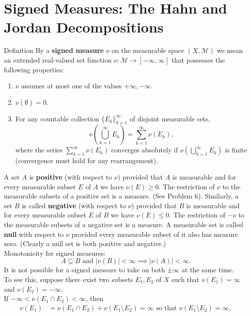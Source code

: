 \section{Signed Measures: The Hahn and Jordan Decompositions}
\begin{flushleft}
	\begin{namedthm*}{Definition}
		By a \textbf{signed measure} $\nu$ on the measurable space $(X,\mathcal{M})$ we mean an extended real-valued set function $\nu:\mathcal{M}\to[-\infty,\infty]$ that possesses the following properties:
		\begin{enumerate}[label=(\roman*),align=left]  
			\item $\nu$ assumes at most one of the values $+\infty,-\infty$.
			\item $\nu(\emptyset)=0$.
			\item For any countable collection $\{E_k\}_{k=1}^\infty$ of disjoint measurable sets,
			\[
				\nu\left(\bigcup_{k=1}^\infty E_k\right)=\sum_{k=1}^\infty\nu(E_k),
			\]
			where the series $\sum_{k=1}^\infty\nu(E_k)$ converges absolutely if $\nu(\bigcup_{k=1}^\infty E_k)$ is finite (convergence must hold for any rearrangement).
		\end{enumerate}
	\end{namedthm*}
	A set $A$ is \textbf{positive} (with respect to $\nu$) provided that $A$ is measurable and for every measurable subset $E$ of $A$ we have $\nu(E)\ge0$.
	The restriction of $\nu$ to the measurable subsets of a positive set is a measure.
	(See Problem 6).
	Similarly, a set $B$ is called \textbf{negative} (with respect to $\nu$) provided that $B$ is measurable and for every measurable subset $E$ of $B$ we have $\nu(E)\le0$.
	The restriction of $-\nu$ to the measurable subsets of a negative set is a measure.
	A measurable set is called \textbf{null} with respect to $\nu$ provided every measurable subset of it also has measure zero.
	(Clearly a null set is both positive and negative.)
	\\Monotonicity for signed measures:
	\[
	A\subseteq B\text{ and }|\nu(B)|<\infty\implies|\nu(A)|<\infty.
	\]
	It is not possible for a signed measure to take on both $\pm\infty$ at the same time.
		\\To see this, suppose there exist two subsets $E_1,E_2$ of $X$ such that $\nu(E_1)=\infty$ and $\nu(E_2)=-\infty$.
		\\If $-\infty<\nu(E_1\cap E_2)<\infty$, then 
		\begin{align*}
			\nu(E_1)&=\nu(E_1\cap E_2)+\nu(E_1\setminus E_2)=\infty\text{ so that }\nu(E_1\setminus E_2)=\infty,\\

\end{align*}
\end{flushleft}
